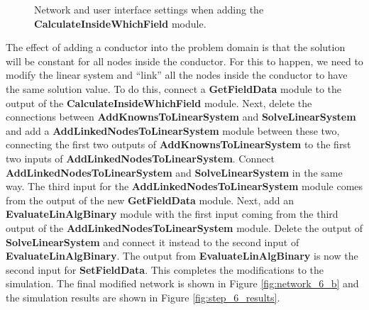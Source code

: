 \documentclass[fleqn,11pt,openany]{book}
\begin{document}
\begin{figure}
\caption{Network and user interface settings when adding the {\bf
CalculateInsideWhichField}
module.}\label{fig:network_6_calculateInside}
\end{figure}

The effect of adding a conductor into the problem domain is that the
solution will be constant for all nodes inside the conductor. For this
to happen, we need to modify the linear system and ``link'' all the
nodes inside the conductor to have the same solution value. To do
this, connect a {\bf GetFieldData} module to the output of the {\bf
CalculateInsideWhichField} module. Next, delete the connections
between {\bf AddKnownsToLinearSystem} and {\bf SolveLinearSystem} and
add a {\bf AddLinkedNodesToLinearSystem} module between these two,
connecting the first two outputs of {\bf AddKnownsToLinearSystem} to
the first two inputs of {\bf AddLinkedNodesToLinearSystem}. Connect
{\bf AddLinkedNodesToLinearSystem} and {\bf SolveLinearSystem} in the
same way. The third input for the {\bf AddLinkedNodesToLinearSystem}
module comes from the output of the new {\bf GetFieldData} module.
Next, add an {\bf EvaluateLinAlgBinary} module with the first input
coming from the third output of the {\bf AddLinkedNodesToLinearSystem}
module. Delete the output of {\bf SolveLinearSystem} and connect it
instead to the second input of {\bf EvaluateLinAlgBinary}. The output
from {\bf EvaluateLinAlgBinary} is now the second input for {\bf
SetFieldData}. This completes the modifications to the simulation. The
final modified network is shown in Figure \ref{fig:network_6_b} and
the simulation results are shown in Figure \ref{fig:step_6_results}.
\end{document}
